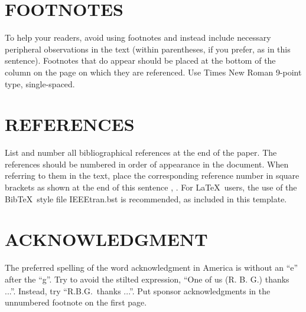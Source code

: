 \documentclass[a4paper,10pt,oneside]{article}
\begin{document}
\begin{sloppy}
\section{FOOTNOTES}
\label{sec:foot}

To help your readers, avoid using footnotes and instead include necessary peripheral observations in the text (within parentheses, if you prefer, as in this sentence). Footnotes that do appear should be placed at the bottom of the column on the page on which they are referenced. Use Times New Roman 9-point type, single-spaced. 

\section{REFERENCES}
\label{sec:ref}

List and number all bibliographical references at the end of the paper. The references should be numbered in order of appearance in the document. When referring to them in the text, place the corresponding reference number in square brackets as shown at the end of this sentence \cite{aBee2001}, \cite{mSmith2001}. For \LaTeX\ users, the use of the Bib\TeX\ style file IEEEtran.bst is recommended, as included in this template.

\section{ACKNOWLEDGMENT}
\label{sec:ack}

The preferred spelling of the word acknowledgment in America is without an ``e'' after the ``g''. Try to avoid the stilted expression, ``One of us (R. B. G.) thanks ...''. Instead, try ``R.B.G.\ thanks ...''. Put sponsor acknowledgments in the unnumbered footnote on the first page.



%
% 
%
% 

\end{sloppy}
\end{document}
